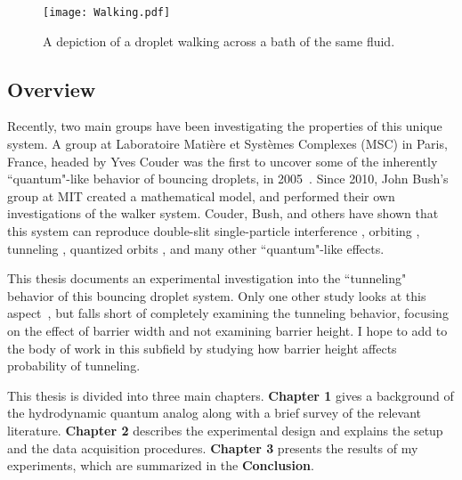 \begin{figure}[h!]
	\centering
	\texttt{[image: Walking.pdf]}
	\caption{A depiction of a droplet walking across a bath of the same fluid.}
	\label{bounce}
\end{figure}
	    
	  
\subsection*{Overview}	  
	  
	Recently, two main groups have been investigating the properties of this unique system. A group at Laboratoire Mati\`{e}re et Syst\`{e}mes Complexes (MSC) in Paris, France, headed by Yves Couder was the first to uncover some of the inherently ``quantum"-like behavior of bouncing droplets, in 2005~\cite{Couder2005b}. Since 2010, John Bush's group at MIT created a mathematical model, and performed their own investigations of the walker system. Couder, Bush, and others have shown that this system can reproduce double-slit single-particle interference , orbiting , tunneling , quantized orbits , and many other ``quantum"-like effects. 
		
	This thesis documents an experimental investigation into the ``tunneling" behavior of this bouncing droplet system. Only one other study looks at this aspect~\cite{tunneling}, but falls short of completely examining the tunneling behavior, focusing on the effect of barrier width and not examining barrier height. I hope to add to the body of work in this subfield by studying how barrier height affects probability of tunneling.   
	
	This thesis is divided into three main chapters. \textbf{Chapter 1} gives a background of the hydrodynamic quantum analog along with a brief survey of the relevant literature. \textbf{Chapter 2} describes the experimental design and explains the setup and the data acquisition procedures. \textbf{Chapter 3} presents the results of my experiments, which are summarized in the \textbf{Conclusion}. 
